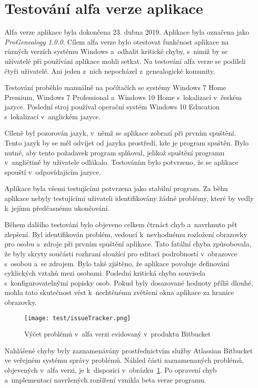 	\section*{Testování alfa verze aplikace}
	Alfa verze aplikace byla dokončena 23. dubna 2019. Aplikace byla označena jako \emph{ProGenealogy 1.0.0}. Cílem alfa verze bylo otestovat funkčnost aplikace na různých verzích systému Windows a~odhalit kritické chyby, s~nimiž by se uživatelé při používáni aplikace mohli setkat. Na testování alfa verze se podíleli čtyři uživatelé. Ani jeden z~nich nepocházel z~genealogické komunity.\par
	Testování proběhlo manuálně na počítačích se systémy Windows 7 Home Premium, Windows 7 Professional a~Windows 10 Home s~lokalizací v~českém jazyce. Poslední stroj používal operační systém Windows 10 Education s~lokalizací v~anglickém jazyce. \par
	Cíleně byl pozorován jazyk, v~němž se aplikace zobrazí při prvním spuštění. Tento jazyk by se měl odvíjet od jazyka prostředí, kde je program spuštěn. Bylo nutné, aby tento požadavek program splňoval, jelikož spuštění programu v~angličtině by uživatele odlákalo. Testováním bylo potvrzeno, že se aplikace spouští v~odpovídajícím jazyce.\par
	Aplikace byla všemi testujícími potvrzena jako stabilní program. Za běhu aplikace nebyly testujícími uživateli identifikovány žádné problémy, které by vedly k~jejímu předčasnému ukončování. \par
	Během dalšího testování bylo objeveno celkem čtrnáct chyb a~navrhnuto pět zlepšení. Byl identifikován problém, vedoucí k~nevhodnému rozložení obrazovky pro osobu a~zdroje při prvním spuštění aplikace. Tato fatální chyba způsobovala, že byly skryty součásti rozhraní sloužící pro editaci podrobností v~obrazovce s~osobou a~se zdrojem. Bylo také zjištěno, že aplikace povoluje definování cyklických vztahů mezi osobami. Poslední kritická chyba souvisela s~konfigurovatelnými popisky osob. Pokud byly dosazované hodnoty příliš dlouhé, mohla tato skutečnost vést k~nechtěnému zvětšení okna aplikace za hranice obrazovky. \par
	\begin{figure}[b!]
		\centering
		\texttt{[image: test/issueTracker.png]}
		\caption{Výčet problémů v~alfa verzi evidovaný v~produktu Bitbucket}
		\label{fig:issueTrack}
	\end{figure}
	Nahlášené chyby byly zaznamenávány prostřednictvím služby Atlassian Bitbucket ve veřejném systému správy problémů. Náhled části zaznamenaných problémů, objevených v~alfa verzi, je k~dispozici v~obrázku~\ref{fig:issueTrack}. Po opravení chyb a~implementaci navržených rozšíření vznikla beta verze programu.\par
	

